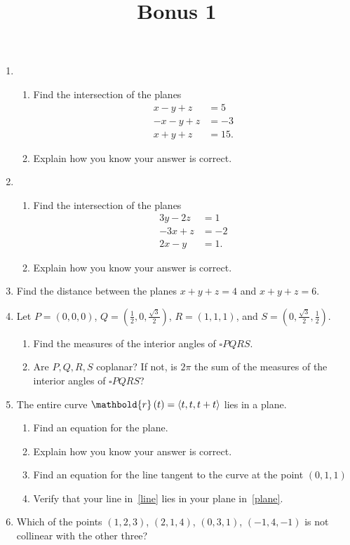 \documentclass[12pt]{article}
\title{Bonus 1}
\author{}\date{}
\let\sin\relax\DeclareMathOperator{\sin}{\mathsf{sin}}
\let\cos\relax\DeclareMathOperator{\cos}{\mathsf{cos}}
\begin{document}
\maketitle
\thispagestyle{empty}

\begin{enumerate}

\item
\begin{enumerate}
\item Find the intersection of the planes
\begin{align*}
x-y+z&=5\\
-x-y+z&=-3\\
x+y+z&=15.
\end{align*}
\item Explain how you know your answer is correct.
\end{enumerate}

\item
\begin{enumerate}
\item Find the intersection of the planes
\begin{align*}
3y-2z&=1\\
-3x+z&=-2\\
2x-y&=1.
\end{align*}
\item Explain how you know your answer is correct.
\end{enumerate}

\item Find the distance between the planes
$x+y+z=4$ and $x+y+z=6$.

\item Let $P=\left(0,0,0\right)$,
$Q=\left(\frac{1}{2},0,\frac{\sqrt{3}}{2}\right)$,
$R=\left(1,1,1\right)$, and
$S=\left(0,\frac{\sqrt{3}}{2},\frac{1}{2}\right)$.
\begin{enumerate}
\item Find the measures of the interior angles
of $\square PQRS$.
\item Are $P,Q,R,S$ coplanar? If not, is $2\pi$ the
sum of the measures of the interior angles of
$\square PQRS$?
\end{enumerate}

\item
The entire curve $\mathbold{r}\left(t\right)
=\left\langle\cos{t},\sin{t},\cos{t}+\sin{t}\right\rangle$
lies in a plane.
\begin{enumerate}
\item\label{plane} Find an equation for the plane.
\item Explain how you know your answer is correct.
\item\label{line} Find an equation for the line tangent to the curve
at the point $\left(0,1,1\right)$
\item Verify that your line in~\autoref{line} lies in your plane
in~\autoref{plane}.
\end{enumerate}

\item Which of the points
$\left(1,2,3\right)$, $\left(2,1,4\right)$,
$\left(0,3,1\right)$, $\left(-1,4,-1\right)$
is not collinear with the other three?
\end{enumerate}
\end{document}
